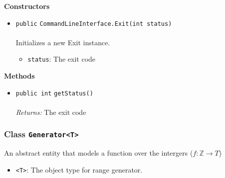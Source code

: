 \textbf{\sffamily Constructors}
\begin{itemize}
\item \lstinline|public| \lstinline|CommandLineInterface.Exit|\lstinline|(int status)|\\ \\[-0.6em]
Initializes a new Exit instance.
\begin{itemize}
\item \lstinline|status|: The exit code
\end{itemize}



\end{itemize}


\textbf{\sffamily Methods}
\begin{itemize}
\item \lstinline|public int| \lstinline|getStatus|\lstinline|()|\\ \\[-0.6em]
\emph{Returns:} The exit code



\end{itemize}

\subsubsection{Class \lstinline|Generator<T>|}
An abstract entity that models a function over the intergers ($f: \mathbb{Z}
 \to T$) \\
\noindent\begin{minipage}[t]{5cm}
\vspace{0.3em}
\hspace*{2em}
\vspace{0.3em}
\end{minipage}

\begin{itemize}
\item \lstinline|<T>|: The object type for range generator.
\end{itemize}




